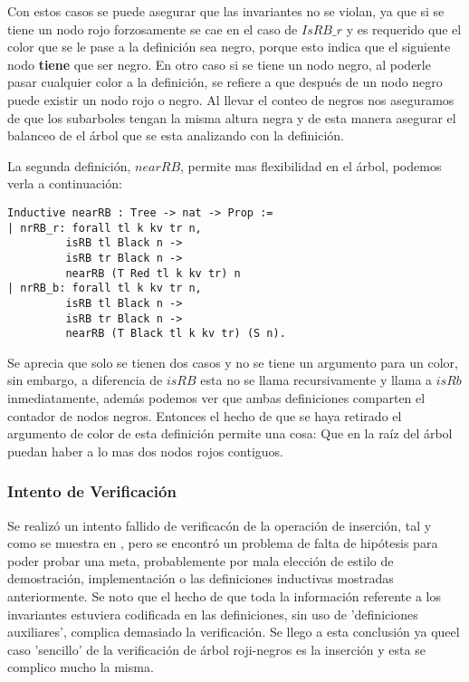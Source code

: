 \documentclass[letterpaper,12pt,oneside]{book}
\newcommand{\arn}{árbol roji-negro}
\theoremstyle{plain}
\theoremstyle{definition}
\theoremstyle{remark}
\begin{document}
Con estos casos se puede asegurar que las invariantes no se violan, ya que si se tiene un nodo rojo forzosamente se cae en el caso de $IsRB\_r$
y es requerido que el color que se le pase a la definici\'on sea negro, porque esto indica que el siguiente nodo \textbf{tiene} que ser negro. 
En otro caso si se tiene un nodo negro, al poderle pasar cualquier color a la definici\'on, se refiere a que después de un nodo negro
puede existir un nodo rojo o negro. Al llevar el conteo de negros nos aseguramos de que los subarboles tengan la misma altura negra y de esta manera
asegurar el balanceo de el \'arbol que se esta analizando con la definici\'on.


La segunda definici\'on, $nearRB$,  permite mas flexibilidad en el \'arbol, podemos verla a continuaci\'on: 
\begin{verbatim}
Inductive nearRB : Tree -> nat -> Prop :=
| nrRB_r: forall tl k kv tr n,
         isRB tl Black n ->
         isRB tr Black n ->
         nearRB (T Red tl k kv tr) n
| nrRB_b: forall tl k kv tr n,
         isRB tl Black n ->
         isRB tr Black n ->
         nearRB (T Black tl k kv tr) (S n).
\end{verbatim}
Se aprecia que solo se tienen dos casos y no se tiene un argumento para un color, sin embargo, a diferencia de $isRB$ esta no se
llama recursivamente y llama a $isRb$ inmediatamente, además podemos ver que ambas definiciones comparten el contador de nodos negros.
Entonces el hecho de que se haya retirado el argumento de color de esta definici\'on permite una cosa: Que en la ra\'iz del \'arbol 
puedan haber a lo mas dos nodos rojos contiguos.

\subsubsection{Intento de Verificaci\'on}
Se realiz\'o un intento fallido de verificac\'on de la operaci\'on de inserci\'on, tal y como se muestra en \cite{appel}, pero se encontró un
problema de falta de hipótesis para poder probar una meta, probablemente por mala elección de estilo de demostraci\'on, implementaci\'on o las definiciones 
inductivas mostradas anteriormente. Se noto que el hecho de que toda la informaci\'on referente a los invariantes estuviera codificada en las definiciones,
sin uso de 'definiciones auxiliares', complica demasiado la verificaci\'on. Se llego a esta conclusi\'on ya queel caso 'sencillo' de la verificaci\'on de
{{{{\arn}}}s} es la inserci\'on y esta se complico mucho la misma.
\end{document}
